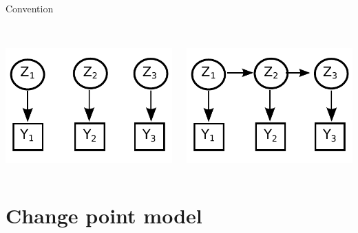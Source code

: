 \documentclass{beamer}\usepackage[]{graphicx}\usepackage[]{color}
\begin{document}
\begin{frame}{Convention}
\begin{columns}
\begin{column}{0.3\textwidth}
\\ \smallskip
\includegraphics[scale=0.4]{Dag2.pdf}
\end{column}
\pause
\begin{column}{0.3\textwidth}
\\ \smallskip
\includegraphics[scale=0.4]{Dag3.pdf}
\end{column}
\end{columns}
\end{frame}


\section{Change point model}
\end{document}
